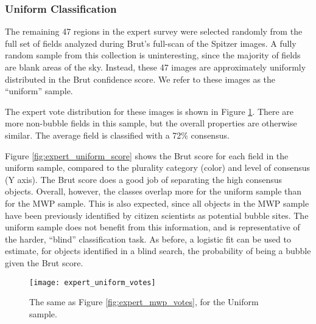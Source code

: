 \documentclass[preprint]{aastex}
\begin{document}
\begin{comment}
Finally, in Figure \ref{fig:expert_roc} we present the ROC curve of each of the three scores, demonstrating the tradeoff of between false and true positive rate.

\begin{figure}[h!]
\texttt{[image: expert\_roc]}
\caption{The receiver operating characteristic curve for the MWP objects reclassified by experts. Each line shows the false positive rate and true positive rate obtained by thresholding the MWP catalog according to the hit rate, Brut score, or joint score. }
\label{fig:expert_roc}
\end{figure}
\end{comment}

\subsubsection{Uniform Classification}
The remaining 47 regions in the expert survey were selected randomly from the full set of fields analyzed during Brut's full-scan of the Spitzer images. A fully random sample from this collection is uninteresting, since the majority of fields are blank areas of the sky. Instead, these 47 images are approximately uniformly distributed in the Brut confidence score. We refer to these images as the ``uniform'' sample. 

The expert vote distribution for these images is shown in Figure \ref{fig:expert_uniform_votes}. There are more non-bubble fields in this sample, but the overall properties are otherwise similar. The average field is classified with a 72\% consensus.

Figure \ref{fig:expert_uniform_score} shows the Brut score for each field in the uniform sample, compared to the plurality category (color) and level of consensus (Y axis). The Brut score does a good job of separating the high consensus objects. Overall, however, the classes overlap more for the uniform sample than for the MWP sample. This is also expected, since all objects in the MWP sample have been previously identified by citizen scientists as potential bubble sites. The uniform sample does not benefit from this information, and is representative of the harder, ``blind'' classification task. As before, a logistic fit can be used to estimate, for objects identified in a blind search, the probability of being a bubble given the Brut score.

\begin{figure}[h!]
\texttt{[image: expert\_uniform\_votes]}
\caption{The same as Figure \ref{fig:expert_mwp_votes}, for the Uniform sample.}
\label{fig:expert_uniform_votes}
\end{figure}
\end{document}
